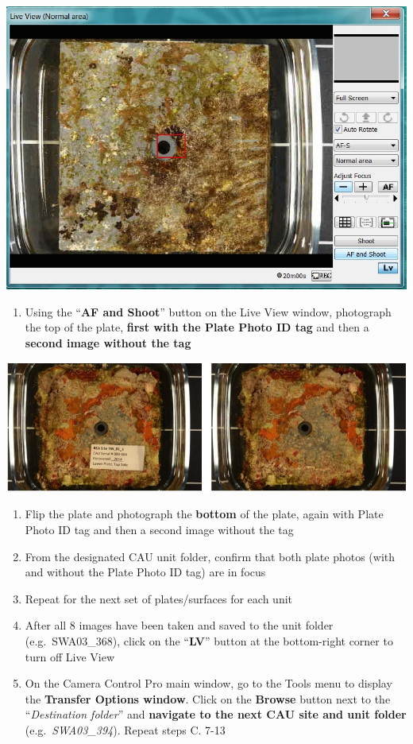\documentclass[]{book}
\providecommand{\tightlist}{%
  \setlength{\itemsep}{0pt}\setlength{\parskip}{0pt}}
\begin{document}
\includegraphics{images/Camera15.jpg}

\begin{enumerate}
\def\labelenumi{\arabic{enumi}.}
\setcounter{enumi}{10}
\tightlist
\item
  Using the ``\textbf{AF and Shoot}'' button on the Live View window, photograph the top of the plate, \textbf{first with the Plate Photo ID tag} and then a \textbf{second image without the tag}
\end{enumerate}

\includegraphics{images/CAU_image.jpg}

\begin{enumerate}
\def\labelenumi{\arabic{enumi}.}
\setcounter{enumi}{11}
\item
  Flip the plate and photograph the \textbf{bottom} of the plate, again with Plate Photo ID tag and then a second image without the tag
\item
  From the designated CAU unit folder, confirm that both plate photos (with and without the Plate Photo ID tag) are in focus
\item
  Repeat for the next set of plates/surfaces for each unit
\item
  After all 8 images have been taken and saved to the unit folder (e.g.~SWA03\_368), click on the ``\textbf{LV}'' button at the bottom-right corner to turn off Live View
\item
  On the Camera Control Pro main window, go to the Tools menu to display the \textbf{Transfer Options window}. Click on the \textbf{Browse} button next to the ``\emph{Destination folder}'' and \textbf{navigate to the next CAU site and unit folder} (e.g.~\emph{SWA03\_394}). Repeat steps C. 7-13
\end{enumerate}
\end{document}

